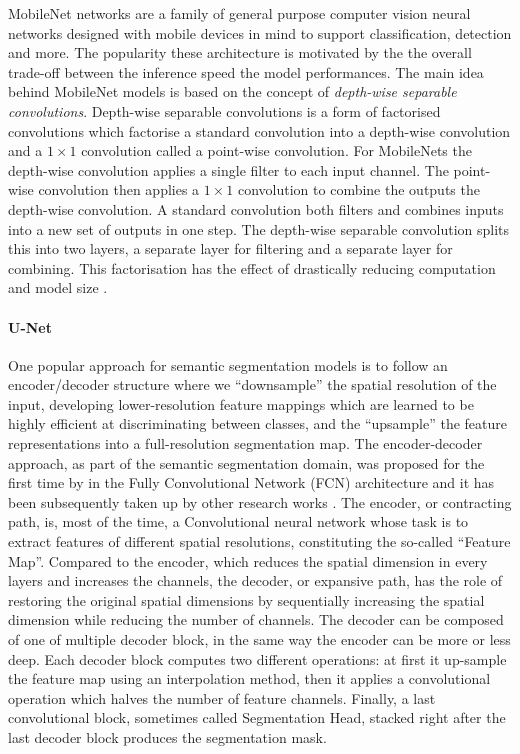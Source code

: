 MobileNet networks \citep{howard2017mobilenets, sandler2018mobilenetv2, howard2019searching} are a family of general purpose computer vision neural networks designed with mobile devices in mind to support classification, detection and more. The popularity these architecture is motivated by the the overall trade-off between the inference speed the model performances.
The main idea behind MobileNet models is based on the concept of \textit{depth-wise separable convolutions}. Depth-wise separable convolutions is a form of factorised convolutions which factorise a standard convolution into a depth-wise convolution and a $1\times1$ convolution called a point-wise convolution. For MobileNets the depth-wise convolution applies a single filter to each input channel. The point-wise convolution then applies a $1\times1$ convolution to combine the outputs the depth-wise convolution. A standard convolution both filters and combines inputs into a new set of outputs in one step. The depth-wise separable convolution splits this into two layers, a separate layer for filtering and a separate layer for combining. This factorisation has the effect of drastically reducing computation and model size \citep{howard2017mobilenets}.


\paragraph{U-Net} \label{U-Net}

One popular approach for semantic segmentation models is to follow an encoder/decoder structure where we “downsample” the spatial resolution of the input, developing lower-resolution feature mappings which are learned to be highly efficient at discriminating between classes, and the “upsample” the feature representations into a full-resolution segmentation map. The encoder-decoder approach, as part of the semantic segmentation domain, was proposed for the first time by \citet{long2015fully} in the Fully Convolutional Network (FCN) architecture and it has been subsequently taken up by other research works \citep{ronneberger2015u,zhao2017pyramid,chen2017rethinking,chen2018encoder,badrinarayanan2017segnet}. The encoder, or contracting path, is, most of the time, a Convolutional neural network whose task is to extract features of different spatial resolutions, constituting the so-called “Feature Map”. Compared to the encoder, which reduces the spatial dimension in every layers and increases the channels, the decoder, or expansive path, has the role of restoring the original spatial dimensions by sequentially increasing the spatial dimension while reducing the number of channels. The decoder can be composed of one of multiple decoder block, in the same way the encoder can be more or less deep. Each decoder block computes two different operations: at first it up-sample the feature map using an interpolation method, then it applies a convolutional operation which halves the number of feature channels. Finally, a last convolutional block, sometimes called Segmentation Head, stacked right after the last decoder block produces the segmentation mask. 

